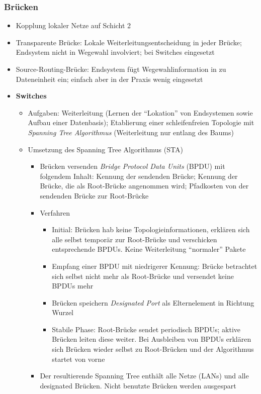 \subsubsection{Brücken}
\begin{itemize}
	\item Kopplung lokaler Netze auf Schicht 2
	\item Transparente Brücke: Lokale Weiterleitungsentscheidung in jeder Brücke; Endsystem nicht in Wegewahl involviert; bei Switches eingesetzt
	\item Source-Routing-Brücke: Endsystem fügt Wegewahlinformation in zu Dateneinheit ein; einfach aber in der Praxis wenig eingesetzt
	\item \textbf{Switches}
	\begin{itemize}
		\item Aufgaben: Weiterleitung (Lernen der "`Lokation"' von Endsystemen sowie Aufbau einer Datenbasis); Etablierung einer schleifenfreien Topologie mit \textit{Spanning Tree Algorithmus} (Weiterleitung nur entlang des Baums)
		\item Umsetzung des Spanning Tree Algorithmus (STA)
		\begin{itemize}
			\item Brücken versenden \textit{Bridge Protocol Data Units} (BPDU) mit folgendem Inhalt: Kennung der sendenden Brücke; Kennung der Brücke, die als Root-Brücke angenommen wird; Pfadkosten von der sendenden Brücke zur Root-Brücke
			\item Verfahren
			\begin{itemize}
				\item Initial: Brücken hab keine Topologieinformationen, erklären sich alle selbst temporär zur Root-Brücke und verschicken entsprechende BPDUs. Keine Weiterleitung "`normaler"' Pakete
				\item Empfang einer BPDU mit niedrigerer Kennung: Brücke betrachtet sich selbst nicht mehr als Root-Brücke und versendet keine BPDUs mehr
				\item Brücken speichern \textit{Designated Port} als Elternelement in Richtung Wurzel
				\item Stabile Phase: Root-Brücke sendet periodisch BPDUs; aktive Brücken leiten diese weiter. Bei Ausbleiben von BPDUs erklären sich Brücken wieder selbst zu Root-Brücken und der Algorithmus startet von vorne
			\end{itemize}
			\item Der resultierende Spanning Tree enthält alle Netze (LANs) und alle designated Brücken. Nicht benutzte Brücken werden ausgespart

\end{itemize}
\end{itemize}
\end{itemize}
